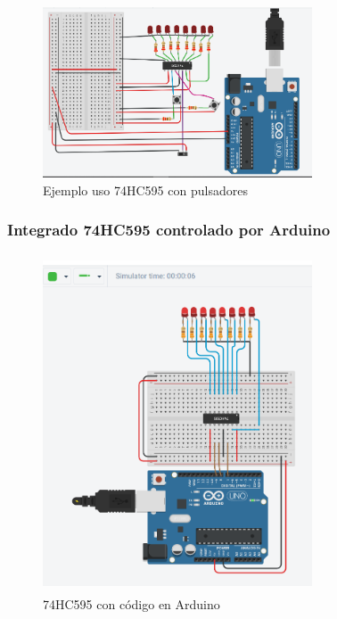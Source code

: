 \documentclass{article}
\begin{document}
\begin{figure}[H]
    \includegraphics[width=8cm ]{imagen/ej_pulsadores.png}
    \centering
    \caption{Ejemplo uso 74HC595 con pulsadores\footnotemark}
    \label{fig:ej_pulsadores}
    \end{figure}


\subsubsection{Integrado 74HC595 controlado por Arduino}

\begin{figure}[H]
    \includegraphics[width=8cm,angle=0, height=10cm]{imagen/74HC595_Arduino.png}
    \centering
    \caption{74HC595 con código en Arduino\footnotemark}
    \label{fig:74HC595_Arduino}
    \end{figure}

\end{document}
